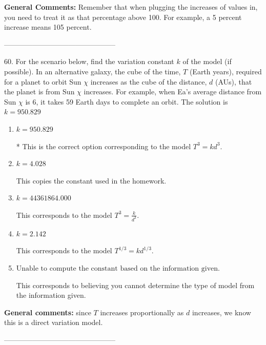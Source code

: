 \documentclass{extbook}[14pt]
\begin{document}
\textbf{General Comments:} Remember that when plugging the increases of values in, you need to treat it as that percentage above 100. For example, a 5 percent increase means 105 percent.

-----------------------------------------------

60. For the scenario below, find the variation constant $k$ of the model (if possible).
In an alternative galaxy, the cube of the time, $T$ (Earth years), required for a planet to orbit Sun $\chi$ increases as the cube of the distance, $d$ (AUs), that the planet is from Sun $\chi$ increases. For example, when Ea's average distance from Sun $\chi$ is 6, it takes 59 Earth days to complete an orbit. 
The solution is $ k = 950.829 $ 

\begin{enumerate}[label=\Alph*.] 
\item $ k = 950.829 $ 

 * This is the correct option corresponding to the model $T^{3} = k d^{3}$. 
\item $ k = 4.028 $ 

 This copies the constant used in the homework. 
\item $ k = 44361864.000 $ 

 This corresponds to the model $T^{3} = \frac{k}{d^{3}}$. 
\item $ k = 2.142 $ 

 This corresponds to the model $T^{1/3} = k d^{1/3}$. 
\item $ \text{Unable to compute the constant based on the information given.} $ 

 This corresponds to believing you cannot determine the type of model from the information given. 
\end{enumerate} 
 
\textbf{General comments:} since $T$ increases proportionally as $d$ increases, we know this is a direct variation model.

-----------------------------------------------
\end{document}
